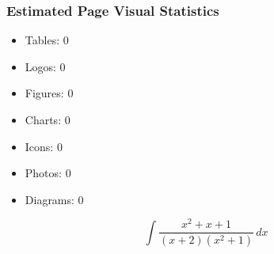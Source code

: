 \documentclass{article}
\begin{document}
\subsubsection*{Estimated Page Visual Statistics}
\begin{itemize}
  \item Tables: 0
  \item Logos: 0
  \item Figures: 0
  \item Charts: 0
  \item Icons: 0
  \item Photos: 0
  \item Diagrams: 0
\end{itemize}

\begin{equation}
\int \frac{x^{2}+x+1}{(x+2)(x^{2}+1)}\,dx
\end{equation}
\end{document}
